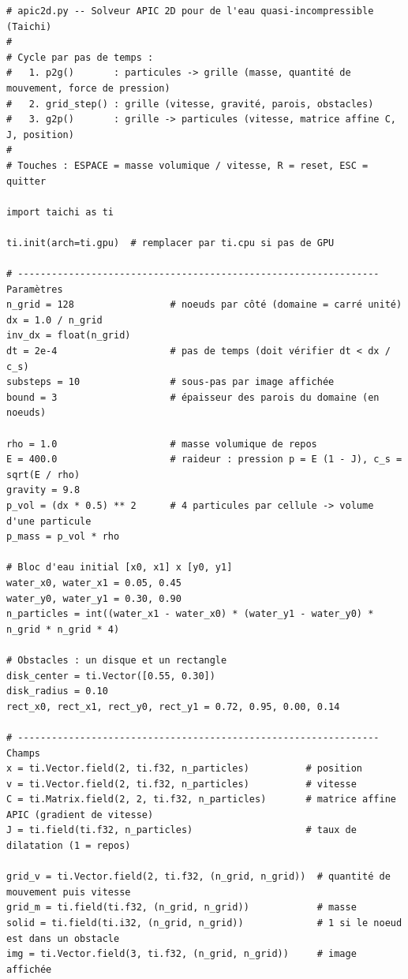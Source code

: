 \documentclass[11pt,a4paper]{article}
\begin{document}
\begin{lstlisting}
# apic2d.py -- Solveur APIC 2D pour de l'eau quasi-incompressible (Taichi)
#
# Cycle par pas de temps :
#   1. p2g()       : particules -> grille (masse, quantité de mouvement, force de pression)
#   2. grid_step() : grille (vitesse, gravité, parois, obstacles)
#   3. g2p()       : grille -> particules (vitesse, matrice affine C, J, position)
#
# Touches : ESPACE = masse volumique / vitesse, R = reset, ESC = quitter

import taichi as ti

ti.init(arch=ti.gpu)  # remplacer par ti.cpu si pas de GPU

# ---------------------------------------------------------------- Paramètres
n_grid = 128                 # noeuds par côté (domaine = carré unité)
dx = 1.0 / n_grid
inv_dx = float(n_grid)
dt = 2e-4                    # pas de temps (doit vérifier dt < dx / c_s)
substeps = 10                # sous-pas par image affichée
bound = 3                    # épaisseur des parois du domaine (en noeuds)

rho = 1.0                    # masse volumique de repos
E = 400.0                    # raideur : pression p = E (1 - J), c_s = sqrt(E / rho)
gravity = 9.8
p_vol = (dx * 0.5) ** 2      # 4 particules par cellule -> volume d'une particule
p_mass = p_vol * rho

# Bloc d'eau initial [x0, x1] x [y0, y1]
water_x0, water_x1 = 0.05, 0.45
water_y0, water_y1 = 0.30, 0.90
n_particles = int((water_x1 - water_x0) * (water_y1 - water_y0) * n_grid * n_grid * 4)

# Obstacles : un disque et un rectangle
disk_center = ti.Vector([0.55, 0.30])
disk_radius = 0.10
rect_x0, rect_x1, rect_y0, rect_y1 = 0.72, 0.95, 0.00, 0.14

# ---------------------------------------------------------------- Champs
x = ti.Vector.field(2, ti.f32, n_particles)          # position
v = ti.Vector.field(2, ti.f32, n_particles)          # vitesse
C = ti.Matrix.field(2, 2, ti.f32, n_particles)       # matrice affine APIC (gradient de vitesse)
J = ti.field(ti.f32, n_particles)                    # taux de dilatation (1 = repos)

grid_v = ti.Vector.field(2, ti.f32, (n_grid, n_grid))  # quantité de mouvement puis vitesse
grid_m = ti.field(ti.f32, (n_grid, n_grid))            # masse
solid = ti.field(ti.i32, (n_grid, n_grid))             # 1 si le noeud est dans un obstacle
img = ti.Vector.field(3, ti.f32, (n_grid, n_grid))     # image affichée



\end{lstlisting}
\end{document}

